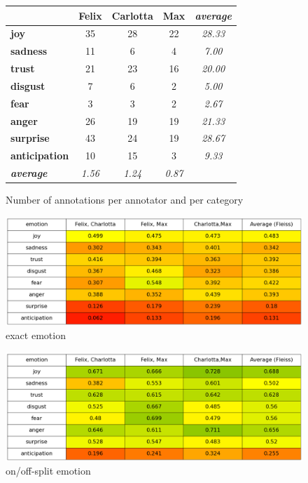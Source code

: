 \documentclass[a4,12pt]{scrartcl}
\begin{document}
\begin{figure}
\centering
\begin{tabular}{l|cccc}
& \textbf{Felix} & \textbf{Carlotta} & \textbf{Max} & \textbf{\textit{average}}\\\hline
\textbf{joy} & 35 & 28 & 22 & \textit{28.33}\\
\textbf{sadness} & 11 & 6 & 4 & \textit{7.00}\\
\textbf{trust} & 21 & 23 & 16 & \textit{20.00}\\
\textbf{disgust} & 7 & 6 & 2 & \textit{5.00}\\
\textbf{fear} & 3 & 3 & 2 & \textit{2.67}\\
\textbf{anger} & 26 & 19 & 19 & \textit{21.33} \\
\textbf{surprise} & 43 & 24 & 19 & \textit{28.67} \\
\textbf{anticipation} & 10 & 15 & 3 & \textit{9.33} \\
\textbf{\textit{average}} & \textit{1.56} & \textit{1.24} & \textit{0.87} \\
\end{tabular}
\caption{Number of annotations per annotator and per category}
\end{figure}

\begin{figure}
	\centering
	\includegraphics[width=0.7\linewidth]{emotion-eval-equal_distance}
	\caption[]{exact emotion}
	\label{fig:emotion-eval-equaldistance}
\end{figure}

\begin{figure}
	\centering
	\includegraphics[width=0.7\linewidth]{emotion-eval-on_off_split}
	\caption[]{on/off-split emotion}
	\label{fig:emotion-eval-on_off_split}
\end{figure}
\end{document}
